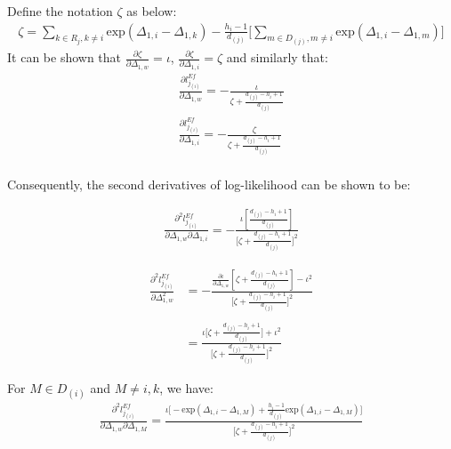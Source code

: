 \documentclass[]{article}
\begin{document}
Define the notation \(\zeta\) as below:
\begin{equation}\begin{aligned}\label{eqn:DefEfron2}
\zeta = \sum_{k\in R_j, k\neq i}\text{exp}(\Delta_{1,i}-\Delta_{1,k})-\frac{h_i-1}{d_{(j)}}\big[\sum_{m\in D_{(j)}, m\neq i}\text{exp}(\Delta_{1,i}-\Delta_{1,m})\big]
\end{aligned}\end{equation} It can be shown that
\(\frac{\partial\zeta}{\partial \Delta_{1,w}}=\iota\),
\(\frac{\partial\zeta}{\partial \Delta_{1,i}}=\zeta\) and similarly
that: \begin{equation}\begin{aligned}\label{eqn:DefEfron2back}
\frac{\partial l_{j_{(i)}}^{Ef}}{\partial\Delta_{1,w}} = -\frac{\iota}{\zeta+\frac{d_{(j)}-h_i+1}{d_{(j)}}} \\
\frac{\partial l_{j_{(i)}}^{Ef}}{\partial\Delta_{1,i}} = -\frac{\zeta}{\zeta+\frac{d_{(j)}-h_i+1}{d_{(j)}}} \\
\end{aligned}\end{equation}

Consequently, the second derivatives of log-likelihood can be shown to
be:

\begin{equation}\begin{aligned}\label{eqn:Efron8}
\frac{\partial^2 l_{j_{(i)}}^{Ef}}{\partial \Delta_{1,w} \partial \Delta_{1,i}} = -\frac{\iota[\frac{d_{(j)}-h_i+1}{d_{(j)}}]}{\bigg[\zeta+\frac{d_{(j)}-h_i+1}{d_{(j)}}\bigg]^2}
\end{aligned}\end{equation}

\begin{equation}\begin{aligned}\label{eqn:Efron9}
\frac{\partial^2 l_{j_{(i)}}^{Ef}}{\partial \Delta_{1,w}^2} &= -\frac{\frac{\partial\iota}{\partial\Delta_{1,w}}[\zeta+\frac{d_{(j)}-h_i+1}{d_{(j)}}]-\iota^2}{\bigg[\zeta+\frac{d_{(j)}-h_i+1}{d_{(j)}}\bigg]^2} \\
\\
&= \frac{\iota \big[\zeta + \frac{d_{(j)}-h_i+1}{d_{(j)}}\big]+\iota^2}{\bigg[\zeta+\frac{d_{(j)}-h_i+1}{d_{(j)}}\bigg]^2}
\end{aligned}\end{equation}

For \(M \in D_{(i)}\) and \(M \neq i,k\), we have:
\begin{equation}\begin{aligned}\label{eqn:Efron10}
\frac{\partial^2 l_{j_{(i)}}^{Ef}}{\partial \Delta_{1,w} \partial \Delta_{1,M}} = \frac{\iota\bigg[-\text{exp}(\Delta_{1,i}-\Delta_{1,M})+\frac{h_i-1}{d_{(j)}}\text{exp}(\Delta_{1,i}-\Delta_{1,M})\bigg]}{\bigg[\zeta+\frac{d_{(j)}-h_i+1}{d_{(j)}}\bigg]^2}
\end{aligned}\end{equation}
\end{document}
